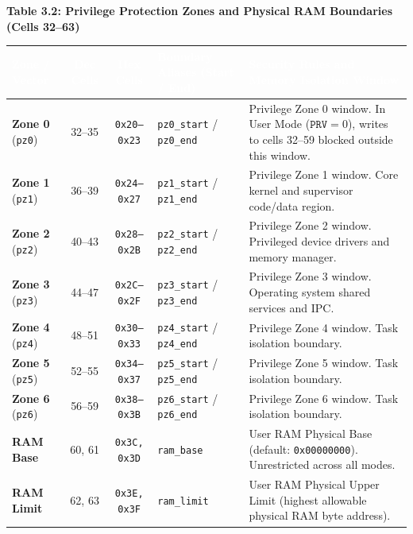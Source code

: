 \documentclass[11pt,a4paper]{article}
\renewcommand{\arraystretch}{1.25}
\begin{document}
\clearpage

\noindent\textbf{Table 3.2: Privilege Protection Zones and Physical RAM Boundaries (Cells 32--63)}
\par\vspace{1.5mm}\noindent
{\footnotesize
\renewcommand{\arraystretch}{0.93}
\begin{tabularx}{\textwidth}{@{} l c c l >{\raggedright\arraybackslash}X @{}}
\toprule
\rowcolor{limslate}
\textcolor{white}{\textbf{Zone / Vector}} & \textcolor{white}{\textbf{Dec Cells}} & \textcolor{white}{\textbf{Hex Cells}} & \textcolor{white}{\textbf{Boundary Aliases (Start / End)}} & \textcolor{white}{\textbf{Security Rules and Memory Isolation Window}} \\
\midrule
\rowcolors{2}{limroweven}{white}
\textbf{Zone 0} (\texttt{pz0}) & 32--35 & \texttt{0x20--0x23} & \texttt{pz0\_start} / \texttt{pz0\_end} & Privilege Zone 0 window. In User Mode (\(\texttt{PRV}=0\)), writes to cells 32--59 blocked outside this window. \\
\textbf{Zone 1} (\texttt{pz1}) & 36--39 & \texttt{0x24--0x27} & \texttt{pz1\_start} / \texttt{pz1\_end} & Privilege Zone 1 window. Core kernel and supervisor code/data region. \\
\textbf{Zone 2} (\texttt{pz2}) & 40--43 & \texttt{0x28--0x2B} & \texttt{pz2\_start} / \texttt{pz2\_end} & Privilege Zone 2 window. Privileged device drivers and memory manager. \\
\textbf{Zone 3} (\texttt{pz3}) & 44--47 & \texttt{0x2C--0x2F} & \texttt{pz3\_start} / \texttt{pz3\_end} & Privilege Zone 3 window. Operating system shared services and IPC. \\
\textbf{Zone 4} (\texttt{pz4}) & 48--51 & \texttt{0x30--0x33} & \texttt{pz4\_start} / \texttt{pz4\_end} & Privilege Zone 4 window. Task isolation boundary. \\
\textbf{Zone 5} (\texttt{pz5}) & 52--55 & \texttt{0x34--0x37} & \texttt{pz5\_start} / \texttt{pz5\_end} & Privilege Zone 5 window. Task isolation boundary. \\
\textbf{Zone 6} (\texttt{pz6}) & 56--59 & \texttt{0x38--0x3B} & \texttt{pz6\_start} / \texttt{pz6\_end} & Privilege Zone 6 window. Task isolation boundary. \\
\textbf{RAM Base} & 60, 61 & \texttt{0x3C, 0x3D} & \texttt{ram\_base} & User RAM Physical Base (default: \texttt{0x00000000}). Unrestricted across all modes. \\
\textbf{RAM Limit} & 62, 63 & \texttt{0x3E, 0x3F} & \texttt{ram\_limit} & User RAM Physical Upper Limit (highest allowable physical RAM byte address). \\
\bottomrule
\end{tabularx}
}
\par\vspace{1.5mm}\par
\end{document}
